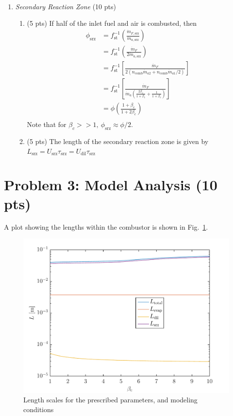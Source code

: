 \documentclass[12pt]{article}
\begin{document}
\begin{enumerate}[label=(\alph*)]
		\item \textit{Secondary Reaction Zone} (10 pts)
			\begin{enumerate}[label=(\roman*)]
				\item (5 pts)
					If half of the inlet fuel and air is combusted, then 
					\begin{equation}
						\begin{aligned}
							\phi_\mathrm{srz} &= f_\mathrm{st}^{-1}\left(\frac{\dot{m}_{F,\mathrm{srz}}}{\dot{m}_{a,\mathrm{srz}}}\right)\\ 
							&=f_\mathrm{st}^{-1}\left(\frac{\dot{m}_{F}}{2\dot{m}_{a,\mathrm{srz}}}\right)\\ 
							&=f_\mathrm{st}^{-1}\left[\frac{\dot{m}_{F}}{2(n_\mathrm{comb}\dot{m}_{a2}+n_\mathrm{comb}\dot{m}_{a1}/2)}\right]\\ 
							&=f_\mathrm{st}^{-1}\left[\frac{\dot{m}_{F}}{\dot{m}_a\left(\frac{2\beta_c}{1+\beta_c}+\frac{1}{1+\beta_c}\right)}\right]\\ 
							&=\boxed{\phi\left(\frac{1+\beta_c}{1+2\beta_c}\right)}\\ 
						\end{aligned}
					\end{equation}
					Note that for $\beta_c>>1,\ \phi_\mathrm{srz}\approx\phi/2$. 
				\item (5 pts)
					The length of the secondary reaction zone is given by $L_\mathrm{srz}=U_\mathrm{srz}\tau_\mathrm{srz}=\boxed{U_\mathrm{dil}\tau_\mathrm{srz}}$
			\end{enumerate}
	\end{enumerate}
\section{Problem 3: Model Analysis (10 pts)}
	A plot showing the lengths within the combustor is shown in Fig.~\ref{FIG_3}.
	\begin{figure}[!t!]
		\begin{center}
			\includegraphics[width=120mm]{problem3.pdf}
			\caption{\label{FIG_3} Length scales for the prescribed parameters, and modeling conditions}
		\end{center}
	\end{figure}
\end{document}
